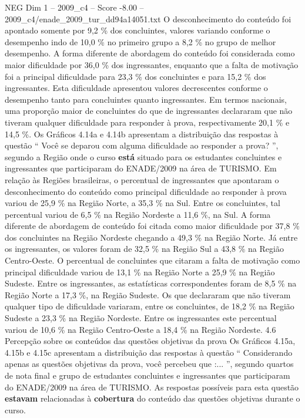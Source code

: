 \begin{textsample}{NEG Dim 1 – 2009\_c4 – Score -8.00 – 2009\_c4/enade\_2009\_tur\_dd94a14051.txt}
O desconhecimento do conteúdo foi apontado somente por 9,2 \% dos concluintes, valores variando conforme o desempenho indo de 10,0 \% no primeiro grupo a 8,2 \% no grupo de melhor desempenho.
A forma diferente de abordagem do conteúdo foi considerada como maior dificuldade por 36,0 \% dos ingressantes, enquanto que a falta de motivação foi a principal dificuldade para 23,3 \% dos concluintes e para 15,2 \% dos ingressantes.
Esta dificuldade apresentou valores decrescentes conforme o desempenho tanto para concluintes quanto ingressantes.
Em termos nacionais, uma proporção maior de concluintes do que de ingressantes declararam que não tiveram qualquer dificuldade para responder à prova, respectivamente 20,1 \% e 14,5 \%.
Os Gráficos 4.14a e 4.14b apresentam a distribuição das respostas à questão “ Você se deparou com alguma dificuldade ao responder a prova? ”, segundo a Região onde o curso \textbf{está} situado para os estudantes concluintes e ingressantes que participaram do ENADE/2009 na área de TURISMO.
Em relação às Regiões brasileiras, o percentual de ingressantes que apontaram o desconhecimento do conteúdo como principal dificuldade ao responder à prova variou de 25,9 \% na Região Norte, a 35,3 \% na Sul.
Entre os concluintes, tal percentual variou de 6,5 \% na Região Nordeste a 11,6 \%, na Sul.
A forma diferente de abordagem de conteúdo foi citada como maior dificuldade por 37,8 \% dos concluintes na Região Nordeste chegando a 49,3 \% na Região Norte.
Já entre os ingressantes, os valores foram de 32,5 \% na Região Sul a 43,8 \% na Região Centro-Oeste.
O percentual de concluintes que citaram a falta de motivação como principal dificuldade variou de 13,1 \% na Região Norte a 25,9 \% na Região Sudeste.
Entre os ingressantes, as estatísticas correspondentes foram de 8,5 \% na Região Norte a 17,3 \%, na Região Sudeste.
Os que declararam que não tiveram qualquer tipo de dificuldade variaram, entre os concluintes, de 18,2 \% na Região Sudeste a 23,3 \% na Região Nordeste.
Entre os ingressantes este percentual variou de 10,6 \% na Região Centro-Oeste a 18,4 \% na Região Nordeste. 4.6 Percepção sobre os conteúdos das questões objetivas da prova Os Gráficos 4.15a, 4.15b e 4.15c apresentam a distribuição das respostas à questão “ Considerando apenas as questões objetivas da prova, você percebeu que :... ”, segundo quartos de nota final e grupo de estudantes concluintes e ingressantes que participaram do ENADE/2009 na área de TURISMO.
As respostas possíveis para esta questão \textbf{estavam} relacionadas à \textbf{cobertura} do conteúdo das questões objetivas durante o curso.

\end{textsample}
